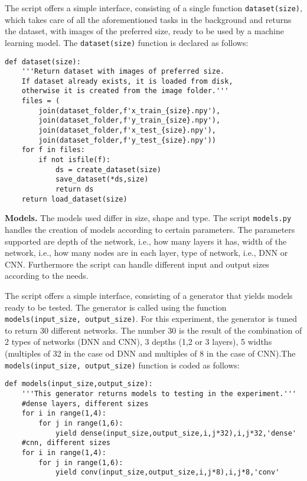 The script offers a simple interface, consisting of a single function \texttt{dataset(size)}, which takes care of all the aforementioned tasks in the background and returns the dataset, with images of the preferred size, ready to be used by a machine learning model. The \texttt{dataset(size)} function is declared as follows:
\begin{verbatim}
def dataset(size):
    '''Return dataset with images of preferred size.
    If dataset already exists, it is loaded from disk,
    otherwise it is created from the image folder.'''
    files = (
        join(dataset_folder,f'x_train_{size}.npy'),
        join(dataset_folder,f'y_train_{size}.npy'),
        join(dataset_folder,f'x_test_{size}.npy'),
        join(dataset_folder,f'y_test_{size}.npy'))
    for f in files:
        if not isfile(f):
            ds = create_dataset(size)
            save_dataset(*ds,size)
            return ds
    return load_dataset(size)
\end{verbatim}

\textbf{Models.}
The models used differ in size, shape and type. The script \texttt{models.py} handles the creation of models according to certain parameters. The parameters supported are depth of the network, i.e., how many layers it has, width of the network, i.e., how many nodes are in each layer, type of network, i.e., DNN or CNN. Furthermore the script can handle different input and output sizes according to the needs.

The script offers a simple interface, consisting of a generator that yields models ready to be tested. The generator is called using the function \texttt{models(input\_size, output\_size)}. For this experiment, the generator is tuned to return 30 different networks. The number 30 is the result of the combination of 2 types of networks (DNN and CNN), 3 depths (1,2 or 3 layers), 5 widths (multiples of 32 in the case od DNN and multiples of 8 in the case of CNN).The \texttt{models(input\_size, output\_size)} function is coded as follows:
\begin{verbatim}
def models(input_size,output_size):
    '''This generator returns models to testing in the experiment.'''
    #dense layers, different sizes
    for i in range(1,4):
        for j in range(1,6):
            yield dense(input_size,output_size,i,j*32),i,j*32,'dense'
    #cnn, different sizes
    for i in range(1,4):
        for j in range(1,6):
            yield conv(input_size,output_size,i,j*8),i,j*8,'conv'
\end{verbatim}

